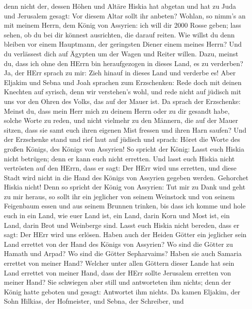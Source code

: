 denn nicht der, dessen Höhen und Altäre Hiskia hat abgetan und hat zu
Juda und Jerusalem gesagt: Vor diesem Altar sollt ihr anbeten?
 Wohlan, so nimm's an mit meinem Herrn, dem König von
Assyrien: ich will dir 2000 Rosse geben; lass sehen, ob du bei dir
könnest ausrichten, die darauf reiten.  Wie willst du denn
bleiben vor einem Hauptmann, der geringsten Diener einem meines Herrn?
Und du verlässest dich auf Ägypten um der Wagen und Reiter willen.
 Dazu, meinst du, dass ich ohne den HErrn bin heraufgezogen
in dieses Land, es zu verderben? Ja, der HErr sprach zu mir: Zieh hinauf
in dieses Land und verderbe es!  Aber Eljakim und Sebna und
Joah sprachen zum Erzschenken: Rede doch mit deinen Knechten auf
syrisch, denn wir verstehen's wohl, und rede nicht auf jüdisch mit uns
vor den Ohren des Volks, das auf der Mauer ist.  Da sprach
der Erzschenke: Meinst du, dass mein Herr mich zu deinem Herrn oder zu
dir gesandt habe, solche Worte zu reden, und nicht vielmehr zu den
Männern, die auf der Mauer sitzen, dass sie samt euch ihren eigenen Mist
fressen und ihren Harn saufen?  Und der Erzschenke stand
und rief laut auf jüdisch und sprach: Höret die Worte des großen Königs,
des Königs von Assyrien!  So spricht der König: Lasst euch
Hiskia nicht betrügen; denn er kann euch nicht erretten. 
Und lasst euch Hiskia nicht vertrösten auf den HErrn, dass er sagt: Der
HErr wird uns erretten, und diese Stadt wird nicht in die Hand des
Königs von Assyrien gegeben werden.  Gehorchet Hiskia
nicht! Denn so spricht der König von Assyrien: Tut mir zu Dank und geht
zu mir heraus, so sollt ihr ein jeglicher von seinem Weinstock und von
seinem Feigenbaum essen und aus seinem Brunnen trinken, 
bis dass ich komme und hole euch in ein Land, wie euer Land ist, ein
Land, darin Korn und Most ist, ein Land, darin Brot und Weinberge sind.
 Lasst euch Hiskia nicht bereden, dass er sagt: Der HErr
wird uns erlösen. Haben auch der Heiden Götter ein jeglicher sein Land
errettet von der Hand des Königs von Assyrien?  Wo sind die
Götter zu Hamath und Arpad? Wo sind die Götter Sepharvaims? Haben sie
auch Samaria errettet von meiner Hand?  Welcher unter allen
Göttern dieser Lande hat sein Land errettet von meiner Hand, dass der
HErr sollte Jerusalem erretten von meiner Hand?  Sie
schwiegen aber still und antworteten ihm nichts; denn der König hatte
geboten und gesagt: Antwortet ihm nichts.  Da kamen
Eljakim, der Sohn Hilkias, der Hofmeister, und Sebna, der Schreiber, und
